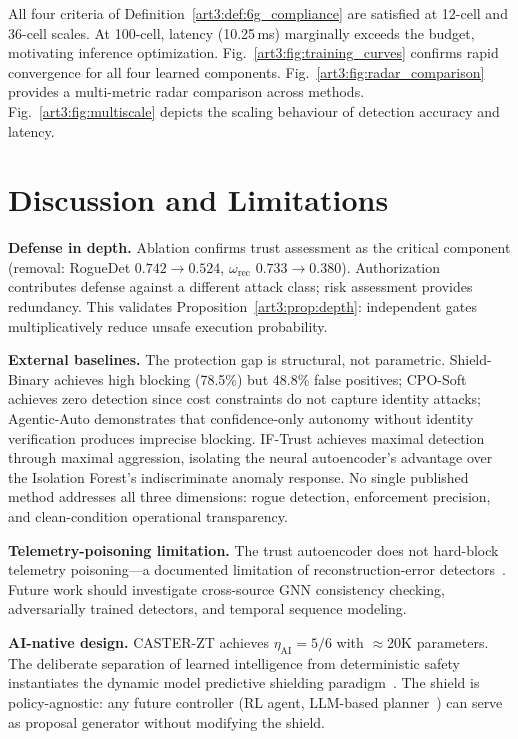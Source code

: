 All four criteria of Definition~\ref{art3:def:6g_compliance} are satisfied at 12-cell and 36-cell scales.
At 100-cell, latency (10.25\,ms) marginally exceeds the budget, motivating inference optimization.
Fig.~\ref{art3:fig:training_curves} confirms rapid convergence for all four learned components.
Fig.~\ref{art3:fig:radar_comparison} provides a multi-metric radar comparison across methods.
Fig.~\ref{art3:fig:multiscale} depicts the scaling behaviour of detection accuracy and latency.


\section{Discussion and Limitations}
\label{art3:sec:discussion}

\noindent\textbf{Defense in depth.}
Ablation confirms trust assessment as the critical component (removal: RogueDet $0.742 \to 0.524$, $\omega_{\mathrm{rec}}$ $0.733 \to 0.380$).
Authorization contributes defense against a different attack class; risk assessment provides redundancy.
This validates Proposition~\ref{art3:prop:depth}: independent gates multiplicatively reduce unsafe execution probability.

\noindent\textbf{External baselines.}
The protection gap is structural, not parametric.
Shield-Binary achieves high blocking (78.5\%) but 48.8\% false positives; CPO-Soft achieves zero detection since cost constraints do not capture identity attacks; Agentic-Auto demonstrates that confidence-only autonomy without identity verification produces imprecise blocking.
IF-Trust achieves maximal detection through maximal aggression, isolating the neural autoencoder's advantage over the Isolation Forest's indiscriminate anomaly response.
No single published method addresses all three dimensions: rogue detection, enforcement precision, and clean-condition operational transparency.

\noindent\textbf{Telemetry-poisoning limitation.}
The trust autoencoder does not hard-block telemetry poisoning---a documented limitation of reconstruction-error detectors~\cite{pang2021deep,erba2020constrained,kravchik2022efficient}.
Future work should investigate cross-source GNN consistency checking, adversarially trained detectors, and temporal sequence modeling.

\noindent\textbf{AI-native design.}
CASTER-ZT achieves $\eta_{\mathrm{AI}} = 5/6$ with $\approx$20K parameters.
The deliberate separation of learned intelligence from deterministic safety instantiates the dynamic model predictive shielding paradigm~\cite{roderick2024dmps}.
The shield is policy-agnostic: any future controller (RL agent, LLM-based planner~\cite{toward_autonomous_oran_2026,lee2024llmran}) can serve as proposal generator without modifying the shield.

